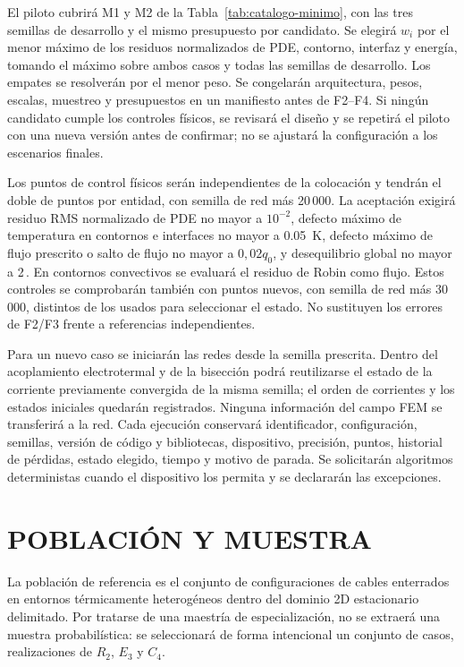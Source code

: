 El piloto cubrirá M1 y M2 de la Tabla~\ref{tab:catalogo-minimo}, con las tres semillas de desarrollo y el mismo presupuesto por candidato. Se elegirá $w_i$ por el menor máximo de los residuos normalizados de PDE, contorno, interfaz y energía, tomando el máximo sobre ambos casos y todas las semillas de desarrollo. Los empates se resolverán por el menor peso. Se congelarán arquitectura, pesos, escalas, muestreo y presupuestos en un manifiesto antes de F2--F4. Si ningún candidato cumple los controles físicos, se revisará el diseño y se repetirá el piloto con una nueva versión antes de confirmar; no se ajustará la configuración a los escenarios finales.

Los puntos de control físicos serán independientes de la colocación y tendrán el doble de puntos por entidad, con semilla de red más 20\,000. La aceptación exigirá residuo RMS normalizado de PDE no mayor a $10^{-2}$, defecto máximo de temperatura en contornos e interfaces no mayor a \SI{0.05}{\kelvin}, defecto máximo de flujo prescrito o salto de flujo no mayor a $0{,}02q_0$, y desequilibrio global no mayor a 2\,\pct{}. En contornos convectivos se evaluará el residuo de Robin como flujo. Estos controles se comprobarán también con puntos nuevos, con semilla de red más 30\,000, distintos de los usados para seleccionar el estado. No sustituyen los errores de F2/F3 frente a referencias independientes.

Para un nuevo caso se iniciarán las redes desde la semilla prescrita. Dentro del acoplamiento electrotermal y de la bisección podrá reutilizarse el estado de la corriente previamente convergida de la misma semilla; el orden de corrientes y los estados iniciales quedarán registrados. Ninguna información del campo FEM se transferirá a la red. Cada ejecución conservará identificador, configuración, semillas, versión de código y bibliotecas, dispositivo, precisión, puntos, historial de pérdidas, estado elegido, tiempo y motivo de parada. Se solicitarán algoritmos deterministas cuando el dispositivo los permita y se declararán las excepciones.

\section{POBLACIÓN Y MUESTRA}

La población de referencia es el conjunto de configuraciones de cables enterrados en entornos térmicamente heterogéneos dentro del dominio 2D estacionario delimitado. Por tratarse de una maestría de especialización, no se extraerá una muestra probabilística: se seleccionará de forma intencional un conjunto de casos, realizaciones de $R_2$, $E_3$ y $C_4$.

